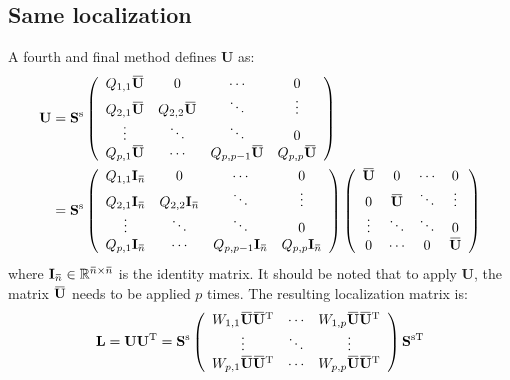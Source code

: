 \documentclass[12pt]{scrartcl}
\newcommand{\overbar}[1]{\mkern 1.5mu\overline{\mkern-1.5mu#1\mkern-1.5mu}\mkern 1.5mu}
\begin{document}
\subsection{Same localization}
A fourth and final method defines $\mathbf{U}$ as:
\begin{align}
\mathbf{U} & = \mathbf{S}^\mathrm{s} \left( \begin{array}{cccc}
Q_{1,1} \overbar{\mathbf{U}} & 0 & \cdots & 0 \\
Q_{2,1} \overbar{\mathbf{U}} & Q_{2,2} \overbar{\mathbf{U}} & \ddots & \vdots \\
\vdots & \ddots & \ddots & 0 \\
Q_{p,1} \overbar{\mathbf{U}} & \cdots & Q_{p,p-1} \overbar{\mathbf{U}} & Q_{p,p} \overbar{\mathbf{U}}
\end{array} \right) \\
 & = \mathbf{S}^\mathrm{s} \left( \begin{array}{cccc}
Q_{1,1} \mathbf{I}_{\overbar{n}} & 0 & \cdots & 0 \\
Q_{2,1} \mathbf{I}_{\overbar{n}} & Q_{2,2} \mathbf{I}_{\overbar{n}} & \ddots & \vdots \\
\vdots & \ddots & \ddots & 0 \\
Q_{p,1} \mathbf{I}_{\overbar{n}} & \cdots & Q_{p,p-1} \mathbf{I}_{\overbar{n}} & Q_{p,p} \mathbf{I}_{\overbar{n}}
\end{array} \right) \left( \begin{array}{cccc}
\overbar{\mathbf{U}} & 0 & \cdots & 0 \\
0 & \overbar{\mathbf{U}} & \ddots & \vdots \\
\vdots & \ddots & \ddots & 0 \\
0 & \cdots & 0 & \overbar{\mathbf{U}} 
\end{array} \right)
\end{align}
where $\mathbf{I}_{\overbar{n}} \in \mathbb{R}^{\overbar{n} \times \overbar{n}}$ is the identity matrix. It should be noted that to apply $\mathbf{U}$, the matrix $\overbar{\mathbf{U}}$ needs to be applied $p$ times. The resulting localization matrix is:
\begin{align}
\mathbf{L} = \mathbf{U} \mathbf{U}^\mathrm{T} = \mathbf{S}^\mathrm{s} \left( \begin{array}{ccc}
W_{1,1} \overbar{\mathbf{U}} \overbar{\mathbf{U}}^\mathrm{T} & \cdots & W_{1,p} \overbar{\mathbf{U}} \overbar{\mathbf{U}}^\mathrm{T} \\
\vdots & \ddots & \vdots  \\
W_{p,1} \overbar{\mathbf{U}} \overbar{\mathbf{U}}^\mathrm{T} & \cdots & W_{p,p} \overbar{\mathbf{U}} \overbar{\mathbf{U}}^\mathrm{T}
\end{array} \right) \mathbf{S}^{\mathrm{s} \mathrm{T}}
\end{align}
\end{document}
